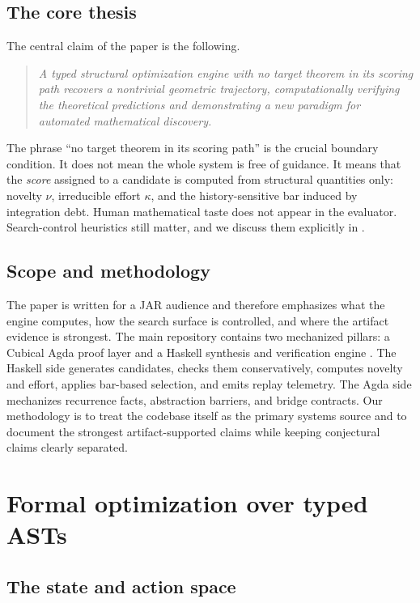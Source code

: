 \documentclass[pdflatex,sn-mathphys,Numbered]{sn-jnl}
\theoremstyle{thmstyleone}
\theoremstyle{thmstylethree}
\theoremstyle{thmstyletwo}
\begin{document}
\subsection{The core thesis}

The central claim of the paper is the following.

\begin{quote}
\emph{A typed structural optimization engine with no target theorem in its scoring path recovers a nontrivial geometric trajectory, computationally verifying the theoretical predictions and demonstrating a new paradigm for automated mathematical discovery.}
\end{quote}

The phrase ``no target theorem in its scoring path'' is the crucial boundary condition. It does not mean the whole system is free of guidance. It means that the \emph{score} assigned to a candidate is computed from structural quantities only: novelty $\nu$, irreducible effort $\kappa$, and the history-sensitive bar induced by integration debt. Human mathematical taste does not appear in the evaluator. Search-control heuristics still matter, and we discuss them explicitly in .

\subsection{Scope and methodology}

The paper is written for a JAR audience and therefore emphasizes what the engine computes, how the search surface is controlled, and where the artifact evidence is strongest. The main repository contains two mechanized pillars: a Cubical Agda proof layer and a Haskell synthesis and verification engine \cite{pen-artifact}. The Haskell side generates candidates, checks them conservatively, computes novelty and effort, applies bar-based selection, and emits replay telemetry. The Agda side mechanizes recurrence facts, abstraction barriers, and bridge contracts. Our methodology is to treat the codebase itself as the primary systems source and to document the strongest artifact-supported claims while keeping conjectural claims clearly separated.

\section{Formal optimization over typed ASTs}\label{sec:formal}

\subsection{The state and action space}
\end{document}
